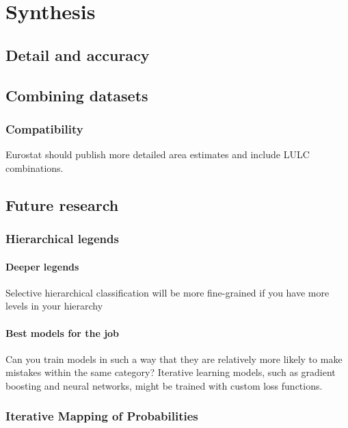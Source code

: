 \chapter[Synthesis]{Synthesis}
\label{cha:Chapter6}
\newpage




\section{Detail and accuracy}


\section{Combining datasets}

    \subsection{Compatibility}
        Eurostat should publish more detailed area estimates and include LULC combinations.


\section{Future research}

    \subsection{Hierarchical legends}

        \subsubsection{Deeper legends}
            Selective hierarchical classification will be more fine-grained if you have more levels in your hierarchy

        \subsubsection{Best models for the job}
            Can you train models in such a way that they are relatively more likely to make mistakes within the same category? Iterative learning models, such as gradient boosting and neural networks, might be trained with custom loss functions.
            
    \subsection{Iterative Mapping of Probabilities}

